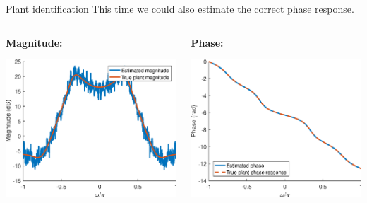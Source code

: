 \documentclass[10pt]{beamer}
\begin{document}
%
\begin{frame}{Plant identification}
This time we could also estimate the correct phase response.
	\begin{columns}
		\begin{column}{0.5\textwidth}
			\textbf{Magnitude:}	
			\begin{center}
				\includegraphics[width=\textwidth]{../homework/figs/inverse_control_xcorr_id_mag.eps}
			\end{center}
		\end{column}
		
		\begin{column}{0.5\textwidth}
			\textbf{Phase:}	
			\begin{center}
				\includegraphics[width=\textwidth]{../homework/figs/inverse_control_xcorr_id_phase.eps}
			\end{center}
		\end{column}
	\end{columns}
\end{frame}
\end{document}
